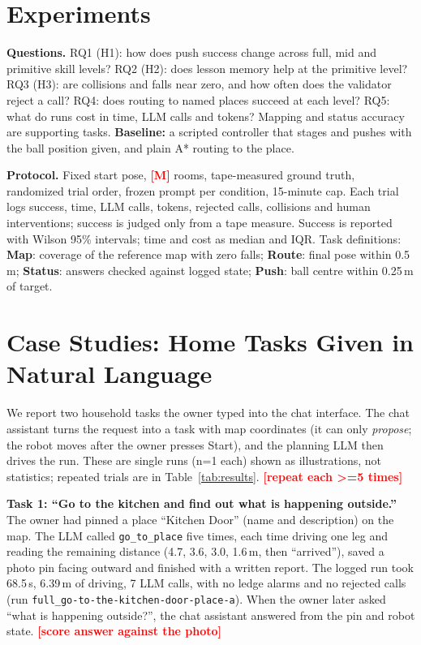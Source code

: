 \documentclass[conference]{IEEEtran}
\newcommand{\todo}[1]{\textcolor{red}{\textbf{[#1]}}}
\begin{document}
\section{Experiments}
\textbf{Questions.}
RQ1 (H1): how does push success change across full, mid and primitive skill levels?
RQ2 (H2): does lesson memory help at the primitive level?
RQ3 (H3): are collisions and falls near zero, and how often does the validator reject a call?
RQ4: does routing to named places succeed at each level?
RQ5: what do runs cost in time, LLM calls and tokens?
Mapping and status accuracy are supporting tasks. \textbf{Baseline:} a scripted controller that stages and pushes with the ball position given, and plain A* routing to the place.

\textbf{Protocol.} Fixed start pose, \todo{M} rooms, tape-measured ground truth, randomized trial order, frozen prompt per condition, 15-minute cap.
Each trial logs success, time, LLM calls, tokens, rejected calls, collisions and human interventions; success is judged only from a tape measure.
Success is reported with Wilson 95\% intervals; time and cost as median and IQR. Task definitions:
\textbf{Map}: coverage of the reference map with zero falls; \textbf{Route}: final pose within 0.5\,m; \textbf{Status}: answers checked against logged state;
\textbf{Push}: ball centre within 0.25\,m of target.


\section{Case Studies: Home Tasks Given in Natural Language}
\label{sec:cases}
We report two household tasks the owner typed into the chat interface. The chat assistant turns the request into a task with map coordinates (it can only \emph{propose}; the robot moves after the owner presses Start), and the planning LLM then drives the run. These are single runs (n=1 each) shown as illustrations, not statistics; repeated trials are in Table~\ref{tab:results}. \todo{repeat each >=5 times}

\textbf{Task 1: ``Go to the kitchen and find out what is happening outside.''}
The owner had pinned a place ``Kitchen Door'' (name and description) on the map. The LLM called \texttt{go\_to\_place} five times, each time driving one leg and reading the remaining distance (4.7, 3.6, 3.0, 1.6\,m, then ``arrived''), saved a photo pin facing outward and finished with a written report.
The logged run took 68.5\,s, 6.39\,m of driving, 7 LLM calls, with no ledge alarms and no rejected calls (run \texttt{full\_go-to-the-kitchen-door-place-a}). When the owner later asked ``what is happening outside?'', the chat assistant answered from the pin and robot state. \todo{score answer against the photo}
\end{document}
